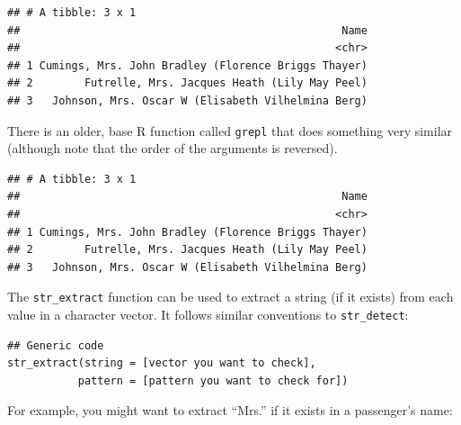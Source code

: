 \documentclass[]{book}
\makeatletter
\newenvironment{Shaded}{\begin{snugshade}}{\end{snugshade}}
\newcommand{\KeywordTok}[1]{\textcolor[rgb]{0.13,0.29,0.53}{\textbf{#1}}}
\newcommand{\DataTypeTok}[1]{\textcolor[rgb]{0.13,0.29,0.53}{#1}}
\newcommand{\DecValTok}[1]{\textcolor[rgb]{0.00,0.00,0.81}{#1}}
\newcommand{\StringTok}[1]{\textcolor[rgb]{0.31,0.60,0.02}{#1}}
\newcommand{\OperatorTok}[1]{\textcolor[rgb]{0.81,0.36,0.00}{\textbf{#1}}}
\newcommand{\NormalTok}[1]{#1}
\newenvironment{kframe}{%
\medskip{}
\setlength{\fboxsep}{.8em}
 \def\at@end@of@kframe{}%
 \ifinner\ifhmode%
  \def\at@end@of@kframe{\end{minipage}}%
  \begin{minipage}{\columnwidth}%
 \fi\fi%
 \def\FrameCommand##1{\hskip\@totalleftmargin \hskip-\fboxsep
 \colorbox{shadecolor}{##1}\hskip-\fboxsep
     \hskip-\linewidth \hskip-\@totalleftmargin \hskip\columnwidth}%
 \MakeFramed {\advance\hsize-\width
   \@totalleftmargin\z@ \linewidth\hsize
   \@setminipage}}%
 {\par\unskip\endMakeFramed%
 \at@end@of@kframe}
\renewenvironment{Shaded}{\begin{kframe}}{\end{kframe}}
\theoremstyle{definition}
\theoremstyle{definition}
\theoremstyle{definition}
\theoremstyle{remark}
\makeatother
\begin{document}
\begin{verbatim}
## # A tibble: 3 x 1
##                                                  Name
##                                                 <chr>
## 1 Cumings, Mrs. John Bradley (Florence Briggs Thayer)
## 2        Futrelle, Mrs. Jacques Heath (Lily May Peel)
## 3   Johnson, Mrs. Oscar W (Elisabeth Vilhelmina Berg)
\end{verbatim}

There is an older, base R function called \texttt{grepl} that does
something very similar (although note that the order of the arguments is
reversed).

\begin{Shaded}
\end{Shaded}

\begin{verbatim}
## # A tibble: 3 x 1
##                                                  Name
##                                                 <chr>
## 1 Cumings, Mrs. John Bradley (Florence Briggs Thayer)
## 2        Futrelle, Mrs. Jacques Heath (Lily May Peel)
## 3   Johnson, Mrs. Oscar W (Elisabeth Vilhelmina Berg)
\end{verbatim}

The \texttt{str\_extract} function can be used to extract a string (if
it exists) from each value in a character vector. It follows similar
conventions to \texttt{str\_detect}:

\begin{verbatim}
## Generic code
str_extract(string = [vector you want to check], 
           pattern = [pattern you want to check for])
\end{verbatim}

For example, you might want to extract ``Mrs.'' if it exists in a
passenger's name:

\begin{Shaded}
\end{Shaded}
\end{document}
